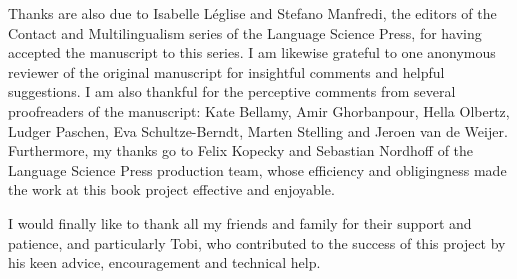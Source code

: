 Thanks are also due to Isabelle Léglise and Stefano Manfredi, the editors of the Contact and Multilingualism  series of the Language Science Press, for having accepted the manuscript to this series. I am likewise grateful to one anonymous reviewer of the original manuscript for insightful comments and helpful suggestions. I am also thankful for the perceptive comments from several proofreaders of the manuscript: Kate Bellamy, Amir Ghorbanpour, Hella Olbertz, Ludger Paschen, Eva Schultze-Berndt, Marten Stelling and Jeroen van de Weijer. Furthermore, my thanks go to Felix Kopecky and Sebastian Nordhoff of the Language Science Press production team, whose efficiency and obligingness made the work at this book project effective and enjoyable.

I would finally like to thank all my friends and family for their support and patience, and particularly Tobi, who contributed to the success of this project by his keen advice, encouragement and technical help.